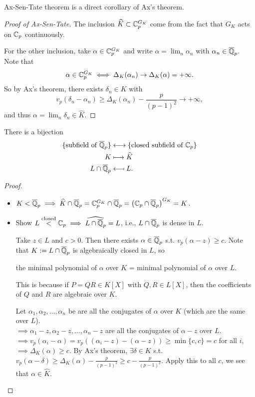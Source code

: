 Ax-Sen-Tate theorem is a direct corollary of Ax's theorem.
\begin{proof}
    [Proof of Ax-Sen-Tate]
    The inclusion $\widehat{K}\subset \mathbb{C}_p^{G_K}$ come from the fact that $G_K$ acts on $\mathbb{C}_p$ continuously.

    For the other inclusion, take $\alpha\in \mathbb{C}_p^{G_K}$ and write $\alpha = \lim_{n}\alpha_n$ with $\alpha_n\in\overline{\mathbb{Q}}_p$.
    Note that \[\alpha\in\mathbb{C}_p^{G_K}\iff \Delta_K(\alpha_n)\to \Delta_K(\alpha) = +\infty.\]
    So by Ax's theorem,
    there exists $\delta_n\in K$ with \[v_p(\delta_n - \alpha_n)\ge \Delta_K(\alpha_n) - \frac{p}{(p-1)^2}\to+\infty,\]
    and thus $\alpha = \lim_n\delta_n\in\widehat{K}$.
\end{proof}

\begin{theorem}
    There is a bijection
    \begin{align*}
        \{\text{subfield of }\overline{\mathbb{Q}}_p\}&\longleftrightarrow
        \{\text{closed subfield of }\mathbb{C}_p\}\\
        K&\longmapsto \widehat{K}\\ 
        L\cap\overline{\mathbb{Q}}_p&\longmapsfrom L.
    \end{align*}
\end{theorem}
\begin{proof}
    \begin{itemize}
\item $K < \overline{\mathbb{Q}}_p\implies \widehat{K}\cap\overline{\mathbb{Q}}_p = \mathbb{C}_p^{G_K}\cap\overline{\mathbb{Q}}_p = \left( \mathbb{C}_p\cap \overline{\mathbb{Q}}_p  \right)^{G_K} = K$.
\item Show $L\stackrel{\text{closed}}{<}\mathbb{C}_p\implies \widehat{L\cap\overline{\mathbb{Q}}_p} = L$, i.e.,
$L\cap\overline{\mathbb{Q}}_p$ is dense in $L$.
\par
Take $z\in L$ and $c > 0$.
Then there exists $\alpha\in\overline{\mathbb{Q}}_p$ s.t. $v_p(\alpha - z)\ge c$.
Note that $K := L\cap\overline{\mathbb{Q}}_p$ is algebraically closed in $L$,
so \begin{center}
    the minimal polynomial of $\alpha$ over $K$ = minimal polynomial of $\alpha$ over $L$. 
\end{center}
This is because if $P = QR\in K[X]$ with $Q, R\in L[X]$, then the coefficients of $Q$ and $R$ are algebraic over $K$.\par
Let $\alpha_1, \alpha_2, \dots, \alpha_n$ be are all the conjugates of $\alpha$ over $K$ (which are the same over $L$).\\
$\implies \alpha_1 - z, \alpha_2 - z, \dots, \alpha_n - z$ are all the conjugates of $\alpha - z$ over $L$.
\\ $\implies v_p(\alpha_i - \alpha) = v_p\left( (\alpha_i - z) - (\alpha - z) \right)\ge \min\{c, c\} = c$ for all $i$, 
\\ $\implies\Delta_K(\alpha)\ge c$.
By Ax's theorem, $\exists\delta\in K$ s.t. $v_p(\alpha - \delta)\ge \Delta_K(\alpha) - \frac{p}{(p-1)^2}\ge c - \frac{p}{(p-1)^2}$.
Apply this to all $c$, we see that $\alpha\in \widehat K$.
\end{itemize}
\end{proof}














